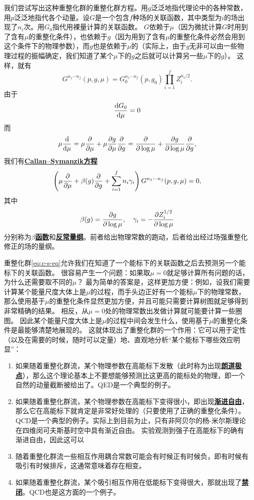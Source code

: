 \documentclass[hyperref, UTF8, a4paper]{ctexart}
\newcommand{\concept}[1]{\underline{\textbf{#1}}}
\begin{document}
我们尝试写出这种重整化群的重整化群方程。用$g$泛泛地指代理论中的各种常数，用$p$泛泛地指代各个动量。设$G$是一个包含$f$种场的关联函数，其中类型为$i$的场出现了$n_i$次。用$G_0$指代用裸量计算的关联函数。
$G$依赖于$\mu$（因为微扰计算$G$时用到了含有$\mu$的重整化条件），也依赖于$g$（因为用到了含有$\mu$的重整化条件必然会用到这个条件下的物理参数），而$g$也是依赖于$\mu$的（实际上，由于$g$无非可以由一些物理过程的振幅确定，我们知道了某个$\mu$下的$g$之后就可以计算另一些$\mu$下的$g$）。
这样，就有
\[
    G^{n_1 \cdots n_f}(p, g, \mu) = G_0^{n_1 \cdots n_f}(p, g_0) \prod_{i=1}^f Z_i^{n_i / 2}.
\]
由于
\[
    \dv{G_0}{\mu} = 0
\]
而
\begin{equation}
    \mu \dv{\mu} = \mu \pdv{\mu} + \mu \pdv{g}{\mu} \pdv{g} = \pdv{\log \mu} + \pdv{g}{\log \mu} \pdv{g},
\end{equation}
我们有\concept{Callan–Symanzik方程}
\begin{equation}
    \left( \mu \pdv{\mu} + \beta(g) \pdv{g} + \sum_{i=1}^f n_i \gamma_i \right) G^{n_1 \cdots n_f}(p, g, \mu) = 0,
    \label{eq:c-s-eq}
\end{equation}
其中
\begin{equation}
    \beta(g) = \pdv{g}{\log \mu}, \quad \gamma_i = - \pdv{Z_i^{1/2}}{\log \mu}
\end{equation}
分别称为\concept{$\beta$函数}和\concept{反常量纲}。前者给出物理常数的跑动，后者给出经过场强重整化修正的场的量纲。

重整化群\eqref{eq:c-s-eq}允许我们在知道了一个能标下的关联函数之后去预测另一个能标下的关联函数。
很容易产生一个问题：如果取$\mu=0$就足够计算所有问题的话，为什么还需要取不同的$\mu$？
最为简单的答案是，这样更加方便：例如，设我们需要计算某个能量尺度大体上是$\mu$的过程，而手头边正好有一个能标$\mu$下的物理常数，那么使用基于$\mu$的重整化条件显然更加方便，并且可能只需要计算树图就足够得到非常精确的结果。
相反，从$\mu=0$处的物理常数出发做计算就可能要计算一些圈图。
因此某个能量尺度大体上是$\mu$的过程中间会发生什么，使用基于$\mu$的重整化条件是最能够清楚地展现的。
这就体现出了重整化群的一个作用：它可以用于定性（以及在需要的时候，随时可以定量）地、直观地分析“某个能标下哪些效应明显”：
\begin{enumerate}
    \item 如果随着重整化群流，某个物理参数在高能标下发散（此时称为出现\concept{朗道极点}），那么这个理论基本上不要想能够预测比这更高的能标处的物理，即一个自然的动量截断被给出了。QED是一个典型的例子。
    \item 如果随着重整化群流，某个物理参数在高能标下变得很小，即出现\concept{渐进自由}，那么它在高能标下就肯定是非常好处理的（只要使用了正确的重整化条件）。QCD是一个典型的例子。实际上到目前为止，只有非阿贝尔的杨-米尔斯理论在四维闵可夫斯基时空中具有渐近自由。
    实验观测到强子在高能标下的确有渐进自由，因此这可以
    \item 随着重整化群流一些相互作用耦合常数可能会有时候正有时候负，即有时候有吸引有时候排斥，这通常意味着存在相变。
    \item 如果随着重整化群流，某个吸引相互作用在低能标下变得很大，那就出现了\concept{禁闭}。QCD也是这方面的一个例子。
\end{enumerate}
\end{document}
